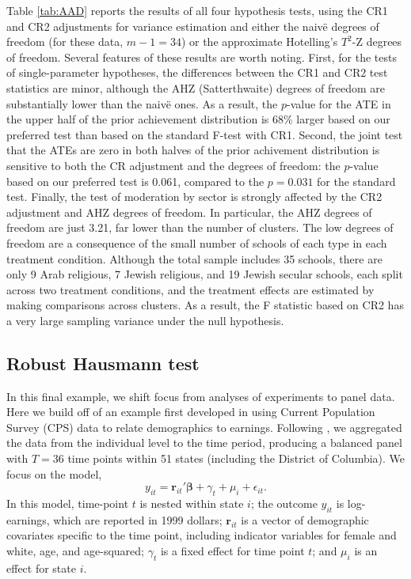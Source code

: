 \documentclass[12pt]{article}\usepackage[]{graphicx}\usepackage[]{color}
\newcommand{\bm}{\mathbf}
\newcommand{\bs}{\boldsymbol}
\begin{document}
Table \ref{tab:AAD} reports the results of all four hypothesis tests, using the CR1 and CR2 adjustments for variance estimation and either the naiv\"e degrees of freedom (for these data, $m - 1 = 34$) or the approximate Hotelling's $T^2$-Z degrees of freedom. 
Several features of these results are worth noting. 
First, for the tests of single-parameter hypotheses, the differences between the CR1 and CR2 test statistics are minor, although the AHZ (Satterthwaite) degrees of freedom are substantially lower than the naiv\"e ones. 
As a result, the $p$-value for the ATE in the upper half of the prior achievement distribution is 68\% larger based on our preferred test than based on the standard F-test with CR1. 
Second, the joint test that the ATEs are zero in both halves of the prior achivement distribution is sensitive to both the CR adjustment and the degrees of freedom: the $p$-value based on our preferred test is 0.061, compared to the $p = 0.031$ for the standard test. 
Finally, the test of moderation by sector is strongly affected by the CR2 adjustment and AHZ degrees of freedom. 
In particular, the AHZ degrees of freedom are just 3.21, far lower than the number of clusters. 
The low degrees of freedom are a consequence of the small number of schools of each type in each treatment condition.
Although the total sample includes 35 schools, there are only 9 Arab religious, 7 Jewish religious, and 19 Jewish secular schools, each split across two treatment conditions, and the treatment effects are estimated by making comparisons across clusters. 
As a result, the F statistic based on CR2 has a very large sampling variance under the null hypothesis.

\subsection{Robust Hausmann test} 

In this final example, we shift focus from analyses of experiments to panel data. 
Here we build off of an example first developed in \citet{Bertrand2004how} using Current Population Survey (CPS) data to relate demographics to earnings. 
Following \citet{Cameron2015practitioners}, we aggregated the data from the individual level to the time period, producing a balanced panel with $T = 36$ time points within 51 states (including the District of Columbia). 
We focus on the model,
\begin{equation}
y_{it} = \bm{r}_{it}'\bs\beta + \gamma_t + \mu_i + \epsilon_{it}.
\end{equation}
In this model, time-point $t$ is nested within state $i$; the outcome $y_{it}$ is log-earnings, which are reported in 1999 dollars; $\bm{r}_{it}$ is a vector of demographic covariates specific to the time point, including indicator variables for female and white, age, and age-squared; $\gamma_t$ is a fixed effect for time point $t$; and $\mu_i$ is an effect for state $i$. 
\end{document}
